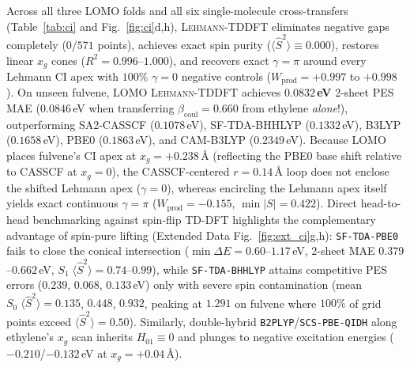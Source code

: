 \documentclass[10pt,twocolumn]{article}
\theoremstyle{natthm}
\newcommand{\leh}{\textsc{Lehmann-TDDFT}}
\newcommand{\Ssq}{\langle\hat{S}^2\rangle}
\begin{document}
Across all three LOMO folds and all six single-molecule cross-transfers (Table~\ref{tab:ci} and Fig.~\ref{fig:ci}d,h), \leh{} eliminates negative gaps completely ($0/571$ points), achieves exact spin purity ($\Ssq\equiv 0.000$), restores linear $x_g$ cones ($R^2=0.996$--$1.000$), and recovers exact $\gamma=\pi$ around every Lehmann CI apex with $100\%$ $\gamma=0$ negative controls ($W_{\mathrm{prod}}=+0.997$ to $+0.998$).
On unseen fulvene, LOMO \leh{} achieves \textbf{$0.0832$\,eV} 2-sheet PES MAE ($0.0846$\,eV when transferring $\beta_{\mathrm{coul}}=0.660$ from ethylene \emph{alone}!), outperforming SA2-CASSCF ($0.1078$\,eV), SF-TDA-BHHLYP ($0.1332$\,eV), B3LYP ($0.1658$\,eV), PBE0 ($0.1863$\,eV), and CAM-B3LYP ($0.2349$\,eV).
Because LOMO places fulvene's CI apex at $x_g=+0.238$\,\AA{} (reflecting the PBE0 base shift relative to CASSCF at $x_g=0$), the CASSCF-centered $r=0.14$\,\AA{} loop does not enclose the shifted Lehmann apex ($\gamma=0$), whereas encircling the Lehmann apex itself yields exact continuous $\gamma=\pi$ ($W_{\mathrm{prod}}=-0.155$, $\min|S|=0.422$).
Direct head-to-head benchmarking against spin-flip TD-DFT\cite{shao2003sftddft,minezawa2009sfci} highlights the complementary advantage of spin-pure lifting (Extended Data Fig.~\ref{fig:ext_ci}g,h): \texttt{SF-TDA-PBE0} fails to close the conical intersection ($\min\Delta E=0.60$--$1.17$\,eV, 2-sheet MAE $0.379$--$0.662$\,eV, $S_1\;\Ssq=0.74$--$0.99$), while \texttt{SF-TDA-BHHLYP} attains competitive PES errors ($0.239$, $0.068$, $0.133$\,eV) only with severe spin contamination (mean $S_0\;\Ssq=0.135$, $0.448$, $0.932$, peaking at $1.291$ on fulvene where $100\%$ of grid points exceed $\Ssq=0.50$).
Similarly, double-hybrid \texttt{B2PLYP}/\texttt{SCS-PBE-QIDH} along ethylene's $x_g$ scan inherits $H_{01}\equiv 0$ and plunges to negative excitation energies ($-0.210$/$-0.132$\,eV at $x_g=+0.04$\,\AA).
\end{document}
